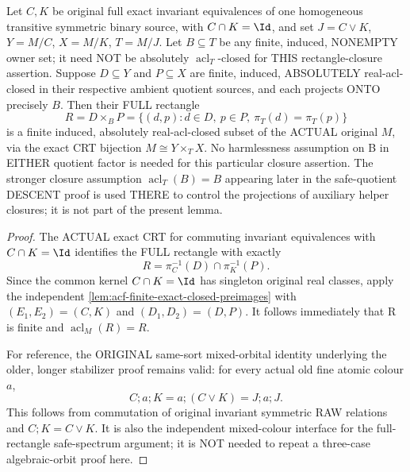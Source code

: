 \begin{lemma}
\label{lem:acf-rectangle-acl}
Let \(C,K\) be original full exact invariant
equivalences of one homogeneous transitive
symmetric binary source, with \(C\cap K=\Id\),
and set \(J=C\vee K\), \(Y=M/C\),
\(X=M/K\), \(T=M/J\). Let \(B\subseteq T\)
be any finite, induced, NONEMPTY owner set;
it need NOT be absolutely
$\operatorname{acl}_T$-closed for THIS
rectangle-closure assertion.
Suppose \(D\subseteq Y\) and \(P\subseteq X\)
are finite, induced, ABSOLUTELY real-acl-closed
in their respective ambient quotient sources,
and each projects ONTO precisely \(B\).
Then their FULL rectangle
\[
       R=D\times_B P
       =\{(d,p):d\in D,\ p\in P,\
                     \pi_T(d)=\pi_T(p)\}
\]
is a finite induced, absolutely
real-acl-closed subset of the ACTUAL
original \(M\), via the exact CRT
bijection \(M\cong Y\times_T X\).
No harmlessness assumption on B
in EITHER quotient factor is needed
for this particular closure assertion.
The stronger closure assumption
$\operatorname{acl}_T(B)=B$
appearing later in the
safe-quotient DESCENT proof
is used THERE to control the
projections of auxiliary
helper closures; it is not
part of the present lemma.
\end{lemma}
\begin{proof}
The ACTUAL exact CRT
for commuting invariant
equivalences with
$C\cap K=\Id$ identifies
the FULL rectangle
with exactly
\[
       R=\pi_C^{-1}(D)
                     \cap\pi_K^{-1}(P).
\]
Since the common kernel
$C\cap K=\Id$ has
singleton original real
classes, apply the
independent
\cref{lem:acf-finite-exact-closed-preimages}
with $(E_1,E_2)=(C,K)$
and $(D_1,D_2)=(D,P)$.
It follows immediately
that R is finite and
$\operatorname{acl}_M(R)=R$.

For reference, the ORIGINAL
same-sort mixed-orbital
identity underlying the
older, longer stabilizer
proof remains valid:
for every actual old
fine atomic colour $a$,
\[
       C;a;K
             =a;(C\vee K)
             =J;a;J.
\tag{RAC}\label{eq:acf-rectangle-mixed-orbit}
\]
This follows from
commutation of original
invariant symmetric RAW
relations and $C;K=C\vee K$.
It is also the independent
mixed-colour interface
for the full-rectangle
safe-spectrum argument;
it is NOT needed to
repeat a three-case
algebraic-orbit proof here.
\end{proof}

